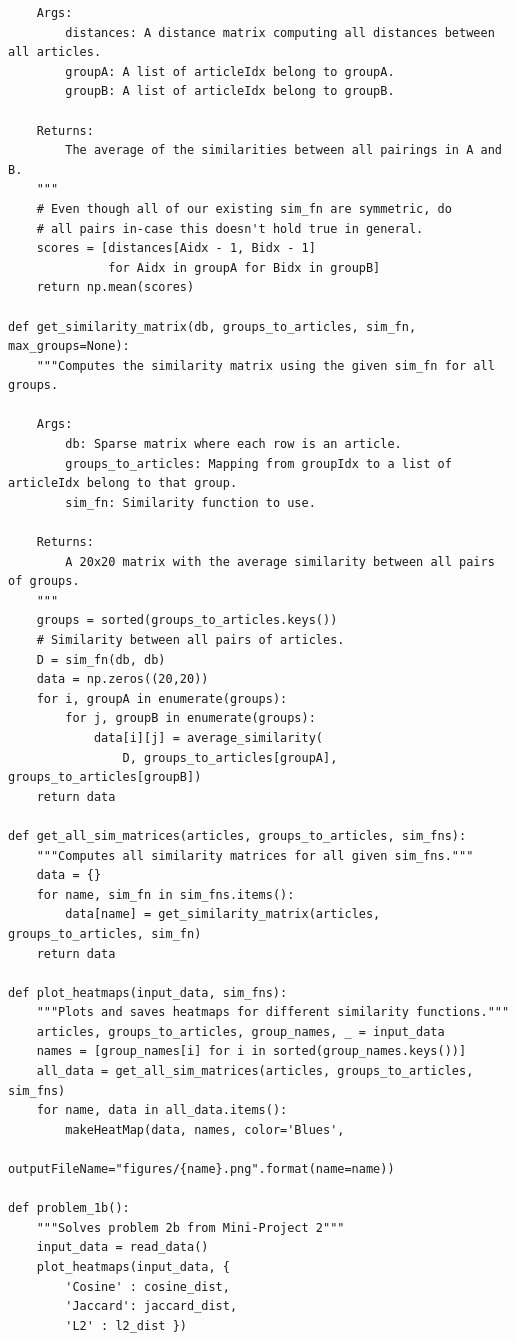 \documentclass[12pt]{article}
\begin{document}
\begin{enumerate}[label=(\alph*)]
\begin{verbatim}
    Args:
        distances: A distance matrix computing all distances between all articles.
        groupA: A list of articleIdx belong to groupA.
        groupB: A list of articleIdx belong to groupB.
    
    Returns:
        The average of the similarities between all pairings in A and B.
    """
    # Even though all of our existing sim_fn are symmetric, do
    # all pairs in-case this doesn't hold true in general.
    scores = [distances[Aidx - 1, Bidx - 1]
              for Aidx in groupA for Bidx in groupB]
    return np.mean(scores)

def get_similarity_matrix(db, groups_to_articles, sim_fn, max_groups=None):
    """Computes the similarity matrix using the given sim_fn for all groups.
    
    Args:
        db: Sparse matrix where each row is an article.
        groups_to_articles: Mapping from groupIdx to a list of articleIdx belong to that group.
        sim_fn: Similarity function to use.
    
    Returns:
        A 20x20 matrix with the average similarity between all pairs of groups.
    """
    groups = sorted(groups_to_articles.keys())
    # Similarity between all pairs of articles.
    D = sim_fn(db, db)
    data = np.zeros((20,20))
    for i, groupA in enumerate(groups):
        for j, groupB in enumerate(groups):
            data[i][j] = average_similarity(
                D, groups_to_articles[groupA], groups_to_articles[groupB])
    return data

def get_all_sim_matrices(articles, groups_to_articles, sim_fns):
    """Computes all similarity matrices for all given sim_fns."""
    data = {}
    for name, sim_fn in sim_fns.items():
        data[name] = get_similarity_matrix(articles, groups_to_articles, sim_fn)
    return data

def plot_heatmaps(input_data, sim_fns):
    """Plots and saves heatmaps for different similarity functions."""
    articles, groups_to_articles, group_names, _ = input_data
    names = [group_names[i] for i in sorted(group_names.keys())]
    all_data = get_all_sim_matrices(articles, groups_to_articles, sim_fns)
    for name, data in all_data.items():
        makeHeatMap(data, names, color='Blues',
                    outputFileName="figures/{name}.png".format(name=name))

def problem_1b():
    """Solves problem 2b from Mini-Project 2"""
    input_data = read_data()
    plot_heatmaps(input_data, {
        'Cosine' : cosine_dist,
        'Jaccard': jaccard_dist,
        'L2' : l2_dist })


\end{verbatim}
\end{enumerate}
\end{document}

